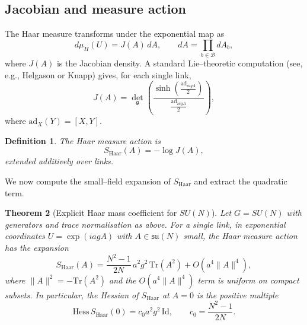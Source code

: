 \documentclass[11pt]{article}
\numberwithin{equation}{section}
\newtheorem{theorem}{Theorem}[section]
\newtheorem{definition}[theorem]{Definition}
\begin{document}
\subsection{Jacobian and measure action}

The Haar measure transforms under the exponential map as
\[
  d\mu_H(U) = J(A)\,dA,\qquad
  dA = \prod_{b\in\mathcal{B}} dA_b,
\]
where $J(A)$ is the Jacobian density.  A standard Lie--theoretic
computation (see, e.g., Helgason or Knapp) gives, for each single link,
\[
  J(A)
  = \det_{\mathfrak{g}}\!\left(
      \frac{\sinh(\tfrac{\mathrm{ad}_{iagA}}{2})}{\tfrac{\mathrm{ad}_{iagA}}{2}}
    \right),
\]
where $\mathrm{ad}_X(Y) = [X,Y]$.

\begin{definition}
The \emph{Haar measure action} is
\[
  S_{\mathrm{Haar}}(A) = -\log J(A),
\]
extended additively over links.
\end{definition}

We now compute the small--field expansion of $S_{\mathrm{Haar}}$ and
extract the quadratic term.

\begin{theorem}[Explicit Haar mass coefficient for $SU(N)$]
\label{thm:Haar-mass-coeff}
Let $G=SU(N)$ with generators and trace normalisation as above.  For a
single link, in exponential coordinates $U=\exp(iagA)$ with
$A\in\mathfrak{su}(N)$ small, the Haar measure action has the expansion
\[
  S_{\mathrm{Haar}}(A)
  = \frac{N^2-1}{2N}\,a^2 g^2\,\mathrm{Tr}(A^2)
    + O(a^4\|A\|^4),
\]
where $\|A\|^2 = -\mathrm{Tr}(A^2)$ and the $O(a^4\|A\|^4)$ term is
uniform on compact subsets.  In particular, the Hessian of
$S_{\mathrm{Haar}}$ at $A=0$ is the positive multiple
\[
  \mathrm{Hess}\,S_{\mathrm{Haar}}(0)
  = c_0 a^2 g^2\,\mathrm{Id},\qquad
  c_0 = \frac{N^2-1}{2N}.
\]
\end{theorem}
\end{document}
